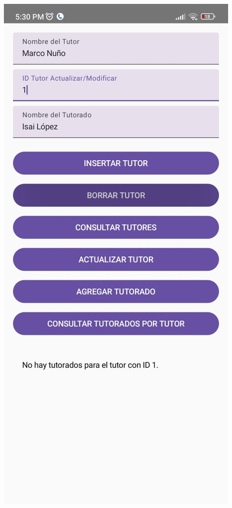 \documentclass[pdf,
serif,
compress,
xcolor=table,
dvipsnames,
spanish,
aspectratio=169]{beamer}
\begin{document}
\begin{frame}
\begin{columns}
        \begin{center}
            \includegraphics[width=0.7\linewidth]{graphics/ConsuTutoradoNull.jpeg} %
        \end{center}


\end{columns}
\end{frame}
\end{document}
